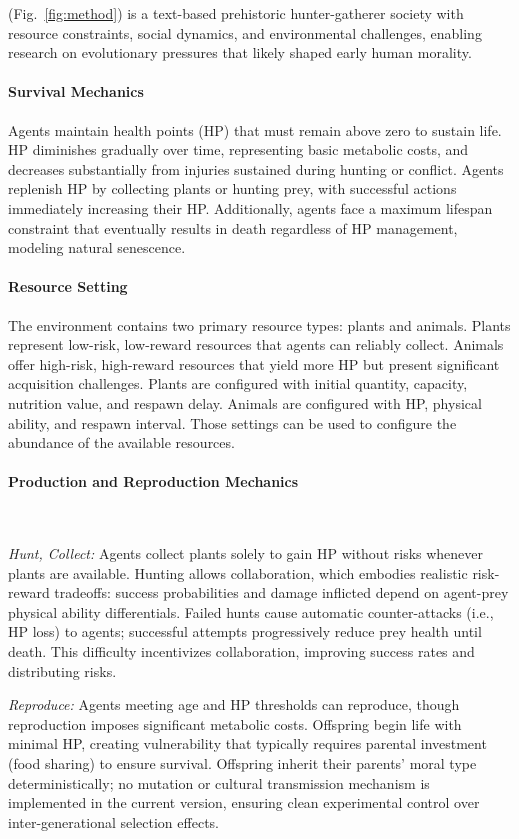 \envframe (Fig.~\ref{fig:method}) is a text-based prehistoric hunter-gatherer society with resource constraints, social dynamics, and environmental challenges, enabling research on evolutionary pressures that likely shaped early human morality.

\paragraph{Survival Mechanics}
Agents maintain health points (HP) that must remain above zero to sustain life. HP diminishes gradually over time, representing basic metabolic costs, and decreases substantially from injuries sustained during hunting or conflict. Agents replenish HP by collecting plants or hunting prey, with successful actions immediately increasing their HP. Additionally, agents face a maximum lifespan constraint that eventually results in death regardless of HP management, modeling natural senescence.

\paragraph{Resource Setting}
The environment contains two primary resource types: plants and animals. Plants represent low-risk, low-reward resources that agents can reliably collect. Animals offer high-risk, high-reward resources that yield more HP but present significant acquisition challenges. 
Plants are configured with initial quantity, capacity, nutrition value, and respawn delay.
Animals are configured with HP, physical ability, and respawn interval.
Those settings can be used to configure the abundance of the available resources.

\paragraph{Production and Reproduction Mechanics}\

\textit{Hunt, Collect:} Agents collect plants solely to gain HP without risks whenever plants are available. Hunting allows collaboration, which embodies realistic risk-reward tradeoffs: success probabilities and damage inflicted depend on agent-prey physical ability differentials. Failed hunts cause automatic counter-attacks (i.e., HP loss) to agents; successful attempts progressively reduce prey health until death. This difficulty incentivizes collaboration, improving success rates and distributing risks.

\textit{Reproduce:} Agents meeting age and HP thresholds can reproduce, though reproduction imposes significant metabolic costs. Offspring begin life with minimal HP, creating vulnerability that typically requires parental investment (food sharing) to ensure survival. Offspring inherit their parents' moral type deterministically; no mutation or cultural transmission mechanism is implemented in the current version, ensuring clean experimental control over inter-generational selection effects.

